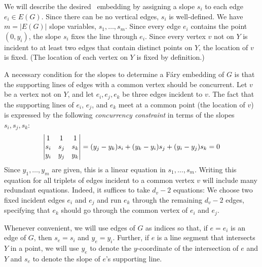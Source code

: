 We will describe the desired \Fary\ embedding by assigning a slope
$s_i$ to each edge $e_i\in E(G)$.  
Since there can be no vertical edges, $s_i$ is well-defined.
We have $m=|E(G)|$ slope variables, $s_1,\ldots,s_m$.  Since every edge
$e_i$ contains the point $(0,y_i)$, the slope $s_i$
fixes the line through $e_i$.  Since every vertex $v$ not on $Y$ is
incident to at least two edges that contain distinct points on $Y$,
the location of $v$ is fixed.  (The location of each vertex on $Y$
is fixed by definition.)

A necessary condition for the slopes to determine a F\'ary embedding of $G$ is that the supporting lines of edges 
with a common vertex should be concurrent. Let $v$ be a vertex 
not on $Y$, and let $e_i, e_j, e_k$ be three edges incident to $v$.
The fact that the supporting lines of $e_i$, $e_j$, and $e_k$
meet at a common point (the location of $v$) is expressed by the following
\emph{concurrency constraint} in terms of the slopes $s_i,s_j,s_k$:
\begin{equation}\eqlabel{slope0} 
\left|
\begin{matrix}
1&1&1\\
s_i&s_j&s_k\\
y_i&y_j&y_k
\end{matrix}
\right|=
({y_j-y_k}) s_i + ({y_k-y_i}) s_j 
+ ({y_i-y_j})s_k  = 0
\end{equation}
Since $y_1,\ldots,y_m$ are given, this is a linear equation
in $s_1,\ldots,s_m$.
Writing this equation for all triplets of edges incident to a common
vertex $v$ will include many redundant equations. Indeed, it suffices to take $d_v-2$ equations: We choose two fixed
incident edges $e_i$ and $e_j$ and run $e_k$ through the remaining
$d_v-2$ edges, specifying that $e_k$ should go through the common vertex
of $e_i$ and $e_j$.

Whenever convenient, we will use edges of $G$
as indices so that, if $e=e_i$ is an edge of $G$, then $s_e=s_i$
and $y_e=y_i$.  Further, if $e$ is a line segment that
intersects $Y$ in a point, we will use $y_e$ to denote the $y$-coordinate
of the intersection of $e$ and $Y$ and $s_e$ to denote the slope of
$e$'s supporting line.


